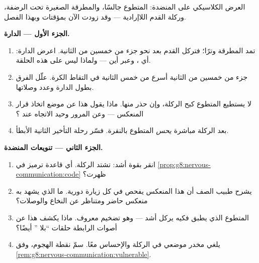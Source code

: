 \begin{problem}\label{pb:g8:nervous-communication:1}
العرض الكلاسيكي على المنضدة: المتطوع جالسًا، والمطرقة
الصغيرة تحت الرضفة، وركلة القدم اللاإرادية --- وقد زودت
الآن بمؤقتات وبهذا الفصل.

\medskip\noindent\textbf{الجزء الأول --- الدارة.}
\begin{enumerate}
  \item تمد المطرقة وترًا؛ فتركل القدم بعد نحو جزء من
        خمسين من الثانية. اعرض الدارة: أي 
        ، وعبر أين --- ولماذا  ليس على
        هذه الحلقة.
  \item جزء من خمسين من الثانية أسرع من خمس الثانية في
        التقاط الكرة. علّل الفرق بطول الدارة وعدد
        وصلاتها.
  \item لا يستطيع المتطوع كبح الركلة، وإن حذر منها. ماذا
        يقول هذا عن موضع اتخاذ قرار المنعكس --- وعن
        المرور وحيد الاتجاه عند ؟
  \item بعد الركلة مباشرة \emph{يحس} المتطوع بالنقرة.
        فسّر رحلة التأخير الثانية الأبطأ.
\end{enumerate}

\medskip\noindent\textbf{الجزء الثاني --- تنويعات المنضدة.}
\begin{enumerate}[resume]
  \item انقر بقوة أشد: تشتد الركلة. أي قاعدة ترميز في
        \cref{prop:g8:nervous-communication:code} ظهرت؟
  \item يشرح طبيب الصف أن هذا المنعكس يفحص في كل زيارة
        دورية. ما الذي يشهد به منعكس  حاضر ومتناظر
        عن النخاع  والوصلات؟
  \item المتطوع الذي يطبق فكيه يركل أشد --- وهو تضخيم
        معروف. ماذا يكشف هذا عن  أصوات 
        الرابطة حلقات ``بلا '' أيضًا؟
  \item يلغي مخدر موضعي في  الركلة والإحساس معًا.
        سمّ نقطة الهجوم، وفق
        \cref{rem:g8:nervous-communication:vulnerable}.
\end{enumerate}


\end{problem}
